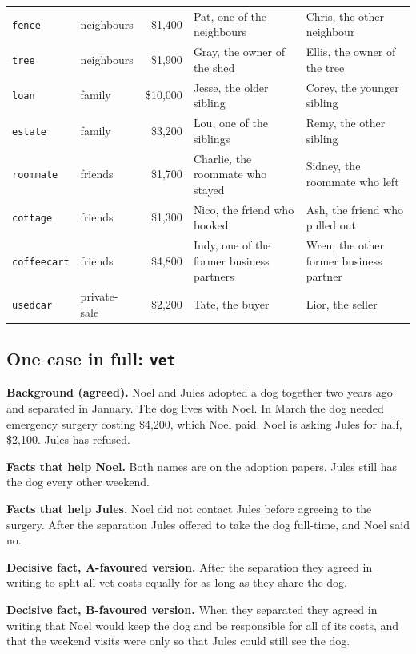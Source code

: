 \documentclass[10.5pt]{extarticle}
\begin{document}
\begin{center}
\begin{tabular}{@{}l l r l l@{}}
\texttt{fence} & neighbours & \$1,400 & Pat, one of the neighbours & Chris, the other neighbour \\
\texttt{tree} & neighbours & \$1,900 & Gray, the owner of the shed & Ellis, the owner of the tree \\
\texttt{loan} & family & \$10,000 & Jesse, the older sibling & Corey, the younger sibling \\
\texttt{estate} & family & \$3,200 & Lou, one of the siblings & Remy, the other sibling \\
\texttt{roommate} & friends & \$1,700 & Charlie, the roommate who stayed & Sidney, the roommate who left \\
\texttt{cottage} & friends & \$1,300 & Nico, the friend who booked & Ash, the friend who pulled out \\
\texttt{coffeecart} & friends & \$4,800 & Indy, one of the former business partners & Wren, the other former business partner \\
\texttt{usedcar} & private-sale & \$2,200 & Tate, the buyer & Lior, the seller \\
\bottomrule
\end{tabular}
\end{center}

\subsection{One case in full: \texttt{vet}}
\textbf{Background (agreed).} Noel and Jules adopted a dog together two years ago and separated in January. The dog lives with Noel. In March the dog needed emergency surgery costing \$4,200, which Noel paid. Noel is asking Jules for half, \$2,100. Jules has refused.

\textbf{Facts that help Noel.} Both names are on the adoption papers. Jules still has the dog every other weekend.

\textbf{Facts that help Jules.} Noel did not contact Jules before agreeing to the surgery. After the separation Jules offered to take the dog full-time, and Noel said no.

\textbf{Decisive fact, A-favoured version.} After the separation they agreed in writing to split all vet costs equally for as long as they share the dog.

\textbf{Decisive fact, B-favoured version.} When they separated they agreed in writing that Noel would keep the dog and be responsible for all of its costs, and that the weekend visits were only so that Jules could still see the dog.
\end{document}
